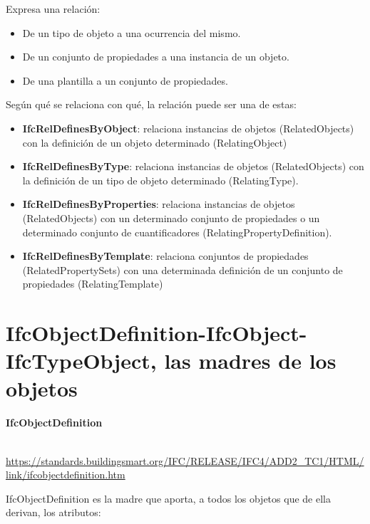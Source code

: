 \documentclass[spanish,12pt,a4paper,final,oneside]{book}
\begin{document}
Expresa una relación:
\begin{itemize}
\item De un tipo de objeto a una ocurrencia del mismo.
\item De un conjunto de propiedades a una instancia de un objeto.
\item De una plantilla a un conjunto de propiedades.
\end{itemize}

Según qué se relaciona con qué, la relación puede ser una de estas:
\begin{itemize}

\item \textbf{IfcRelDefinesByObject}: relaciona instancias de objetos (RelatedObjects) con  la definición de un objeto determinado (RelatingObject)

\item \textbf{IfcRelDefinesByType}: relaciona instancias de objetos (RelatedObjects) con la definición de un tipo de objeto determinado (RelatingType).

\item \textbf{IfcRelDefinesByProperties}: relaciona instancias de objetos (RelatedObjects) con un determinado conjunto de propiedades o un determinado conjunto de cuantificadores (RelatingPropertyDefinition).

\item \textbf{IfcRelDefinesByTemplate}: relaciona conjuntos de propiedades (RelatedPropertySets) con una determinada definición de un conjunto de propiedades (RelatingTemplate)


\end{itemize}



\section{IfcObjectDefinition-IfcObject-IfcTypeObject, las madres de los objetos} \label{entidades_objetos}

\begin{large}\textbf{IfcObjectDefinition}\end{large}
\\ \url{https://standards.buildingsmart.org/IFC/RELEASE/IFC4/ADD2_TC1/HTML/link/ifcobjectdefinition.htm}

IfcObjectDefinition es la madre que aporta, a todos los objetos que de ella derivan, los atributos:
\end{document}
